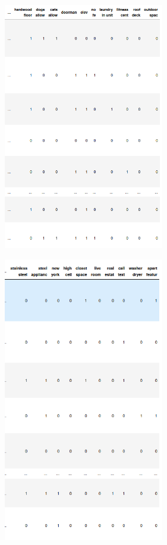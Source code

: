 \documentclass[12pt,twocolumn,letterpaper]{article}
\begin{document}

\begin{figure}[h!]
    \centering
    \includegraphics[width=7cm]{featureMarix.png}
    \caption{}
    \label{fig:galaxy}
\end{figure}

\begin{figure}[h!]
    \centering
    \includegraphics[width=7cm]{bgram.png}
    \caption{}
    \label{fig:galaxy}
\end{figure}
\end{document}
